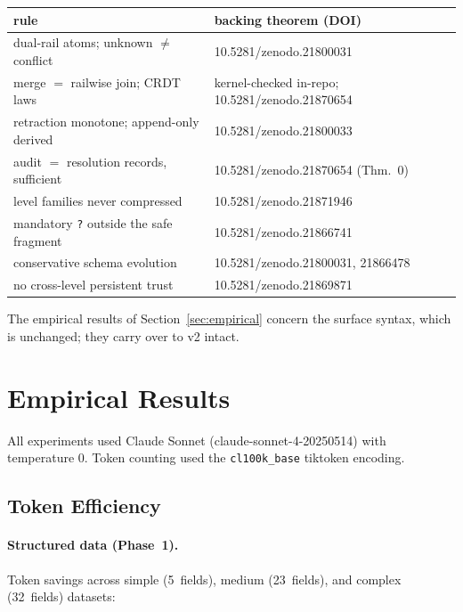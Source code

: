\documentclass[11pt,a4paper]{article}
\begin{document}
\begin{center}
\begin{tabular}{ll}
\hline
rule & backing theorem (DOI) \\
\hline
dual-rail atoms; unknown $\ne$ conflict & 10.5281/zenodo.21800031 \\
merge $=$ railwise join; CRDT laws & kernel-checked in-repo; 10.5281/zenodo.21870654 \\
retraction monotone; append-only derived & 10.5281/zenodo.21800033 \\
audit $=$ resolution records, sufficient & 10.5281/zenodo.21870654 (Thm.~0) \\
level families never compressed & 10.5281/zenodo.21871946 \\
mandatory \texttt{?} outside the safe fragment & 10.5281/zenodo.21866741 \\
conservative schema evolution & 10.5281/zenodo.21800031, 21866478 \\
no cross-level persistent trust & 10.5281/zenodo.21869871 \\
\hline
\end{tabular}
\end{center}

The empirical results of Section~\ref{sec:empirical} concern the surface
syntax, which is unchanged; they carry over to v2 intact.

\section{Empirical Results}
\label{sec:experiments}
\label{sec:empirical}

All experiments used Claude Sonnet (claude-sonnet-4-20250514) with temperature 0. Token counting used the \texttt{cl100k\_base} tiktoken encoding.

\subsection{Token Efficiency}
\label{subsec:tokens}

\paragraph{Structured data (Phase~1).}
Token savings across simple (5~fields), medium (23~fields), and complex (32~fields) datasets:
\end{document}
